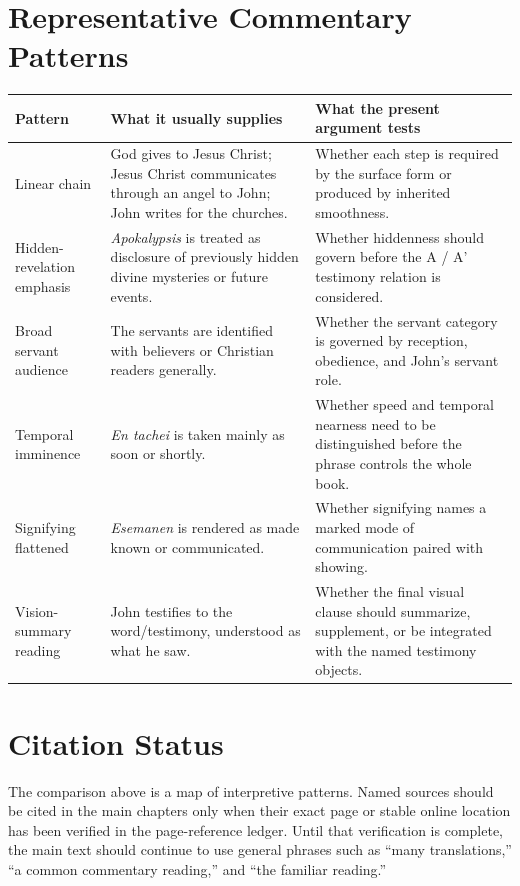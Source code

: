 \section{Representative Commentary Patterns}

\begin{center}
\begin{longtable}{@{}L{0.24\textwidth}L{0.31\textwidth}L{0.35\textwidth}@{}}
\toprule
Pattern & What it usually supplies & What the present argument tests \\
\midrule
Linear chain & God gives to Jesus Christ; Jesus Christ communicates through an angel to John; John writes for the churches. & Whether each step is required by the surface form or produced by inherited smoothness. \\
Hidden-revelation emphasis & \textit{Apokalypsis} is treated as disclosure of previously hidden divine mysteries or future events. & Whether hiddenness should govern before the A / A' testimony relation is considered. \\
Broad servant audience & The servants are identified with believers or Christian readers generally. & Whether the servant category is governed by reception, obedience, and John's servant role. \\
Temporal imminence & \textit{En tachei} is taken mainly as soon or shortly. & Whether speed and temporal nearness need to be distinguished before the phrase controls the whole book. \\
Signifying flattened & \textit{Esemanen} is rendered as made known or communicated. & Whether signifying names a marked mode of communication paired with showing. \\
Vision-summary reading & John testifies to the word/testimony, understood as what he saw. & Whether the final visual clause should summarize, supplement, or be integrated with the named testimony objects. \\
\bottomrule
\end{longtable}
\end{center}

\section{Citation Status}

The comparison above is a map of interpretive patterns. Named sources should be cited in the main chapters only when their exact page or stable online location has been verified in the page-reference ledger. Until that verification is complete, the main text should continue to use general phrases such as ``many translations,'' ``a common commentary reading,'' and ``the familiar reading.''
